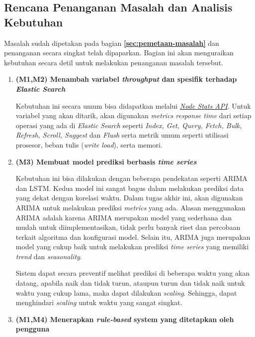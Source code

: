 \subsection{Rencana Penanganan Masalah dan Analisis Kebutuhan}

Masalah sudah dipetakan pada bagian \textbf{\ref{sec:pemetaan-masalah}} dan penanganan secara singkat telah dipaparkan. Bagian ini akan menguraikan kebutuhan secara detil untuk melakukan penanganan masalah tersebut.

\begin{enumerate}
    \item \textbf{(M1,M2) Menambah variabel \textit{throughput} dan spesifik terhadap \textit{Elastic Search}}
    
    Kebutuhan ini secara umum bisa didapatkan melalui \href{https://www.elastic.co/guide/en/elasticsearch/reference/current/cluster-nodes-stats.html}{\textit{Node Stats API}}. Untuk variabel yang akan ditarik, akan digunakan \textit{metrics response time} dari setiap operasi yang ada di \textit{Elastic Search} seperti \textit{Index, Get, Query, Fetch, Bulk, Refresh, Scroll, Suggest} dan \textit{Flush} serta metrik umum seperti utilisasi prosesor, beban tulis (\textit{write load}), serta memori.

    \item \textbf{(M3) Membuat model prediksi berbasis \textit{time series}}
    
    Kebutuhan ini bisa dilakukan dengan beberapa pendekatan seperti ARIMA dan LSTM. Kedua model ini sangat bagus dalam melakukan prediksi data yang dekat dengan korelasi waktu. Dalam tugas akhir ini, akan digunakan ARIMA untuk melakukan prediksi \textit{metrics} yang ada. Alasan menggunakan ARIMA adalah karena ARIMA merupakan model yang sederhana dan mudah untuk diimplementasikan, tidak perlu banyak riset dan percobaan terkait algoritma dan konfigurasi model. Selain itu, ARIMA juga merupakan model yang cukup baik untuk melakukan prediksi \textit{time series} yang memiliki \textit{trend} dan \textit{seasonality}.

    Sistem dapat secara preventif melihat prediksi di beberapa waktu yang akan datang, apabila naik dan tidak turun, ataupun turun dan tidak naik untuk waktu yang cukup lama, maka dapat dilakukan \textit{scaling}. Sehingga, dapat menghindari \textit{scaling} untuk waktu yang sangat singkat.

    \item \textbf{(M1,M4) Menerapkan \textit{rule-based} system yang ditetapkan oleh pengguna}
    

\end{enumerate}
